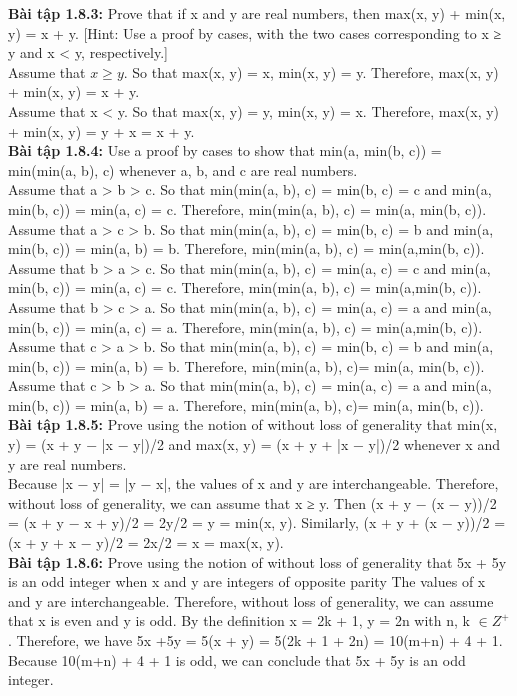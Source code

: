 \documentclass[a4paper]{article}
\begin{document}
\begin{enumerate}
\textbf{Bài tập 1.8.3:}  Prove that if x and y are real numbers, then max(x, y) + min(x, y) = x + y. [Hint: Use a proof by cases, with the two cases corresponding to x ≥ y and x < y, respectively.]\\
Assume that $x \ge y$. So that max(x, y) = x, min(x, y) = y. Therefore, max(x, y) + min(x, y) = x + y.\\
Assume that x < y. So that max(x, y) = y, min(x, y) = x. Therefore, max(x, y) + min(x, y) = y + x = x + y.\\

\textbf{Bài tập 1.8.4:} Use a proof by cases to show that min(a, min(b, c)) =
min(min(a, b), c) whenever a, b, and c are real numbers.\\
Assume that a > b > c. So that min(min(a, b), c) = min(b, c) = c and min(a, min(b, c)) = min(a, c) = c. Therefore, min(min(a, b), c) = min(a, min(b, c)).\\
Assume that a > c > b. So that min(min(a, b), c) = min(b, c) = b and min(a, min(b, c)) = min(a, b) = b. Therefore, min(min(a, b), c) = min(a,min(b, c)).\\
Assume that b > a > c. So that min(min(a, b), c) = min(a, c) = c and min(a, min(b,  c)) = min(a, c) = c. Therefore, min(min(a, b), c) = min(a,min(b, c)).\\
Assume that b > c > a. So that min(min(a, b), c) = min(a, c) = a and min(a, min(b, c)) = min(a, c) = a. Therefore, min(min(a, b), c) = min(a,min(b, c)).\\
Assume that c > a > b. So that min(min(a, b), c) = min(b, c) = b and min(a, min(b, c)) = min(a, b) = b. Therefore, min(min(a, b), c)= min(a, min(b, c)).\\
Assume that c > b > a. So that min(min(a, b), c) = min(a, c) = a and min(a, min(b, c)) = min(a, b) = a. Therefore, min(min(a, b), c)= min(a, min(b, c)).\\

\textbf{Bài tập 1.8.5:} Prove using the notion of without loss of generality
that min(x, y) = (x + y − |x − y|)/2 and max(x, y) = (x + y + |x − y|)/2 whenever x and y are real numbers.\\
Because |x − y| = |y − x|, the values of x and y are interchangeable. Therefore, without loss of generality, we can assume that x ≥ y. Then (x + y − (x − y))/2 = (x + y − x + y)/2 = 2y/2 = y = min(x, y). Similarly, (x + y + (x − y))/2 = (x + y + x − y)/2 = 2x/2 = x = max(x, y).\\

\textbf{Bài tập 1.8.6:} Prove using the notion of without loss of generality that 5x + 5y is an odd integer when x and y are integers of opposite parity
The values of x and y are interchangeable. Therefore, without loss of generality, we can assume that x is even and y is odd. By the definition x = 2k + 1, y = 2n with n, k $\in Z^{+}$. Therefore, we have 5x +5y = 5(x + y) = 5(2k + 1 + 2n) = 10(m+n) + 4 + 1.\\
Because 10(m+n) + 4 + 1 is odd, we can conclude that 5x + 5y is an odd integer.\\


\end{enumerate}
\end{document}
